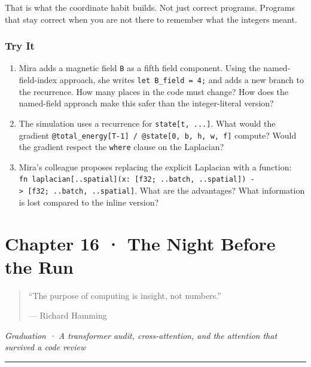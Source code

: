 \documentclass[11pt,]{article}
\begin{document}
That is what the coordinate habit builds. Not just correct programs.
Programs that stay correct when you are not there to remember what the
integers meant.

\hypertarget{try-it-14}{%
\subsubsection{Try It}\label{try-it-14}}

\begin{enumerate}
\def\labelenumi{\arabic{enumi}.}
\item
  Mira adds a magnetic field \texttt{B} as a fifth field component.
  Using the named-field-index approach, she writes
  \texttt{let\ B\_field\ =\ 4;} and adds a new branch to the recurrence.
  How many places in the code must change? How does the named-field
  approach make this safer than the integer-literal version?
\item
  The simulation uses a recurrence for \texttt{state{[}t,\ ...{]}}. What
  would the gradient
  \texttt{@total\_energy{[}T-1{]}\ /\ @state{[}0,\ b,\ h,\ w,\ f{]}}
  compute? Would the gradient respect the \texttt{where} clause on the
  Laplacian?
\item
  Mira's colleague proposes replacing the explicit Laplacian with a
  function:
  \texttt{fn\ laplacian{[}..spatial{]}(x:\ {[}f32;\ ..batch,\ ..spatial{]})\ -\textgreater{}\ {[}f32;\ ..batch,\ ..spatial{]}}.
  What are the advantages? What information is lost compared to the
  inline version?
\end{enumerate}

\newpage

\hypertarget{chapter-16-the-night-before-the-run}{%
\section{Chapter 16 · The Night Before the
Run}\label{chapter-16-the-night-before-the-run}}

\begin{quote}
``The purpose of computing is insight, not numbers.''

--- Richard Hamming
\end{quote}

\emph{Graduation · A transformer audit, cross-attention, and the
attention that survived a code review}

\begin{center}\rule{0.5\linewidth}{0.4pt}\end{center}
\end{document}
